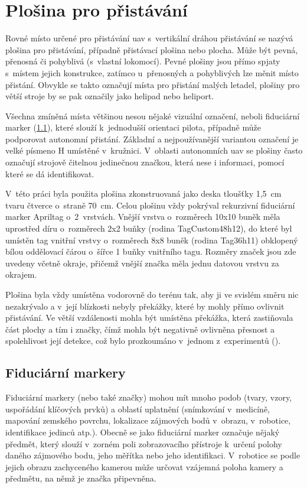 \chapter{Plošina pro přistávání} \label{chap:pad}
  Rovné místo určené pro přistávání \acrshort{uav} s~vertikální dráhou přistávání se nazývá plošina pro přistávání, případně přistávací plošina nebo plocha. Může být pevná, přenosná či pohyblivá (s~vlastní lokomocí). Pevné plošiny jsou přímo spjaty s~místem jejich konstrukce, zatímco u~přenosných a pohyblivých lze měnit místo přistání. Obvykle se takto označují místa pro přistání malých letadel, plošiny pro větší stroje by se pak označily jako helipad nebo heliport.

  Všechna zmíněná místa většinou nesou nějaké vizuální označení, neboli fiduciární marker (\cref{sec:fidu}), které slouží k~jednodušší orientaci pilota, případně může podporovat autonomní přistání. Základní a nejpoužívanější variantou označení je velké písmeno H umístěné v~kružnici. V~oblasti autonomních \acrshort{uav} se plošiny často označují strojově čitelnou jedinečnou značkou, která nese i informaci, pomocí které se dá identifikovat.

  V~této práci byla použita plošina zkonstruovaná jako deska tloušťky 1{,}5~cm tvaru čtverce o~straně 70~cm. Celou plošinu vždy pokrýval rekurzivní fiduciární marker Apriltag o~2~vrstvách. Vnější vrstva o~rozměrech 10x10 buněk měla uprostřed díru o~rozměrech 2x2 buňky (rodina TagCustom48h12), do které byl umístěn tag vnitřní vrstvy o~rozměrech 8x8 buněk (rodina Tag36h11) obklopený bílou oddělovací čárou o~šířce 1 buňky vnitřního tagu. Rozměry značek jsou zde uvedeny včetně okraje, přičemž vnější značka měla jednu datovou vrstvu za okrajem.
  
  Plošina byla vždy umístěna vodorovně do terénu tak, aby ji ve svislém směru nic nezakrývalo a v~její blízkosti nebyly překážky, které by mohly přímo ovlivnit přistávání. Ve větší vzdálenosti mohla být umístěna překážka, která zastiňovala část plochy a tím i značky, čímž mohla být negativně ovlivněna přesnost a spolehlivost její detekce, což bylo prozkoumáno v~jednom z~experimentů ().
  \section{Fiduciární markery} \label{sec:fidu}
    Fiduciární markery (nebo také značky) mohou mít mnoho podob (tvary, vzory, uspořádání klíčových prvků) a oblastí uplatnění (snímkování v~medicíně, mapování zemského povrchu, lokalizace zájmových bodů v~obrazu, v~robotice, identifikace jedinců atp.). Obecně se jako fiduciární marker označuje nějaký předmět, který slouží v~zorném poli zobrazovacího přístroje k~určení polohy daného zájmového bodu, jeho měřítka nebo jeho identifikaci. V~robotice se podle jejich obrazu zachyceného kamerou může určovat vzájemná poloha kamery a předmětu, na němž je značka připevněna.~\cite{kostak:fidmark}
    
